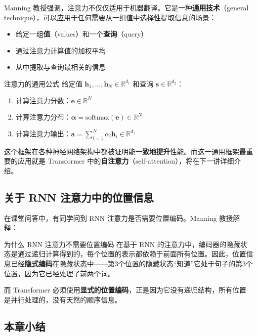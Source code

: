 Manning 教授强调，注意力不仅仅适用于机器翻译。它是一种\textbf{通用技术}（general technique），可以应用于任何需要从一组值中选择性提取信息的场景：

\begin{itemize}
    \item 给定一组\textbf{值}（values）和一个\textbf{查询}（query）
    \item 通过注意力计算值的加权平均
    \item 从中提取与查询最相关的信息
\end{itemize}

\begin{importantbox}{注意力的通用公式}
给定值 $\mathbf{h}_1, \ldots, \mathbf{h}_N \in \mathbb{R}^{d_1}$ 和查询 $\mathbf{s} \in \mathbb{R}^{d_2}$：
\begin{enumerate}
    \item 计算注意力分数：$\mathbf{e} \in \mathbb{R}^N$
    \item 计算注意力分布：$\boldsymbol{\alpha} = \mathrm{softmax}(\mathbf{e}) \in \mathbb{R}^N$
    \item 计算注意力输出：$\mathbf{a} = \sum_{i=1}^N \alpha_i \mathbf{h}_i \in \mathbb{R}^{d_1}$
\end{enumerate}
这个框架在各种神经网络架构中都被证明能\textbf{一致地提升}性能。而这一通用框架最重要的应用就是 Transformer 中的\textbf{自注意力}（self-attention），将在下一讲详细介绍。
\end{importantbox}

\subsection{关于 RNN 注意力中的位置信息}

在课堂问答中，有同学问到 RNN 注意力是否需要位置编码。Manning 教授解释：

\begin{knowledgebox}{为什么 RNN 注意力不需要位置编码}
在基于 RNN 的注意力中，编码器的隐藏状态是通过递归计算得到的，每个位置的表示都依赖于前面所有位置。因此，位置信息已经\textbf{隐式编码}在隐藏状态中——第3个位置的隐藏状态``知道''它处于句子的第3个位置，因为它已经处理了前两个词。

而 Transformer 必须使用\textbf{显式的位置编码}，正是因为它没有递归结构，所有位置是并行处理的，没有天然的顺序信息。
\end{knowledgebox}

\subsection{本章小结}

